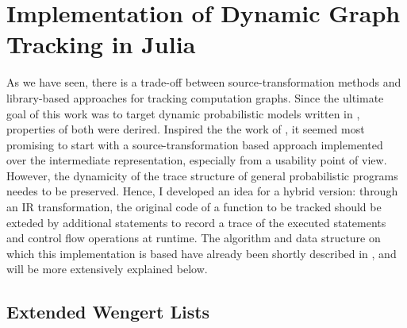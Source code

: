 \chapter{Implementation of Dynamic Graph Tracking in Julia}
\label{cha:impl-dynam-graph}

As we have seen, there is a trade-off between source-transformation methods and library-based
approaches for tracking computation graphs.  Since the ultimate goal of this work was to target
dynamic probabilistic models written in \turingjl{}, properties of both were derired.  Inspired the
the work of \textcite{innes2018don}, it seemed most promising to start with a source-transformation
based approach implemented over the intermediate representation, especially from a usability point
of view.  However, the dynamicity of the trace structure of general probabilistic programs needes to
be preserved.  Hence, I developed an idea for a hybrid version: through an IR transformation, the
original code of a function to be tracked should be exteded by additional statements to record a
trace of the executed statements and control flow operations at runtime.  The algorithm and data
structure on which this implementation is based have already been shortly described in
\textcite{gabler2019graph}, and will be more extensively explained below.


\section{Extended Wengert Lists}
\label{sec:exteded-wengert-lists}

